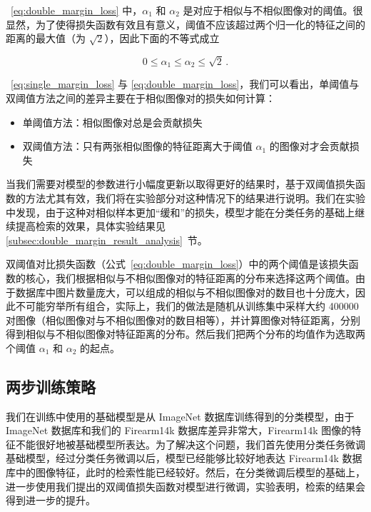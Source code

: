 ~\ref{eq:double_margin_loss} 中，$\alpha_1$ 和 $\alpha_2$ 是对应于相似与不相似图像对的阈值。很显然，为了使得损失函数有效且有意义，阈值不应该超过两个归一化的特征之间的距离的最大值（为 $\sqrt{2}$），因此下面的不等式成立

\begin{equation}
0 \leq \alpha_1 \leq \alpha_2 \leq \sqrt{2}\, .
\end{equation}

~\ref{eq:single_margin_loss} 与 \ref{eq:double_margin_loss}，我们可以看出，单阈值与双阈值方法之间的差异主要在于相似图像对的损失如何计算：

\begin{itemize}
\item 单阈值方法：相似图像对总是会贡献损失
\item 双阈值方法：只有两张相似图像的特征距离大于阈值 $\alpha_1$ 的图像对才会贡献损失
\end{itemize}


当我们需要对模型的参数进行小幅度更新以取得更好的结果时，基于双阈值损失函数的方法尤其有效，我们将在实验部分对这种情况下的结果进行说明。我们在实验中发现，由于这种对相似样本更加“缓和”的损失，模型才能在分类任务的基础上继续提高检索的效果，具体实验结果见 \ref{subsec:double_margin_result_analysis}~节。

双阈值对比损失函数（公式~\ref{eq:double_margin_loss}）中的两个阈值是该损失函数的核心，我们根据相似与不相似图像对的特征距离的分布来选择这两个阈值。由于数据库中图片数量庞大，可以组成的相似与不相似图像对的数目也十分庞大，因此不可能穷举所有组合，实际上，我们的做法是随机从训练集中采样大约 400000 对图像（相似图像对与不相似图像对的数目相等），并计算图像对特征距离，分别得到相似与不相似图像对特征距离的分布。然后我们把两个分布的均值作为选取两个阈值 $\alpha_1$ 和 $\alpha_2$ 的起点。

\subsection{两步训练策略}

我们在训练中使用的基础模型是从 ImageNet 数据库训练得到的分类模型，由于 ImageNet 数据库和我们的 Firearm14k 数据库差异非常大，Firearm14k 图像的特征不能很好地被基础模型所表达。为了解决这个问题，我们首先使用分类任务微调基础模型，经过分类任务微调以后，模型已经能够比较好地表达 Firearm14k 数据库中的图像特征，此时的检索性能已经较好。然后，在分类微调后模型的基础上，进一步使用我们提出的双阈值损失函数对模型进行微调，实验表明，检索的结果会得到进一步的提升。

